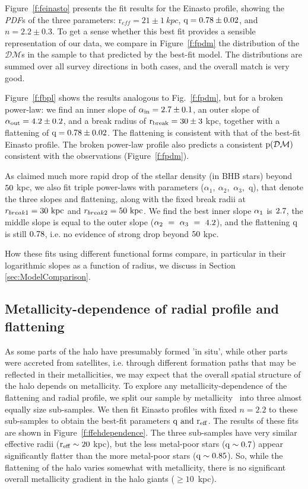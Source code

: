 \documentclass[12pt,preprint]{aastex}
\newcommand{\DM}{\mathcal{DM}}
\newcommand{\reff}{\ensuremath{\mathrm{r}_{eff}}}
\begin{document}
Figure~\ref{f:feinasto} presents the fit results for the Einasto profile,  showing the \textit{PDF}s of the three parameters: 
$\reff =21\pm1~kpc$, $\rm q=0.78\pm0.02$, and $n=2.2\pm0.3$.
To get a sense whether this best fit provides a sensible representation of our data, we compare
 in Figure~\ref{f:fpdm} the distribution of the $\DM$s in the sample to that predicted by the best-fit model. The distributions are summed over all survey directions in both cases, and the overall match is very good. 

Figure~\ref{f:fbpl} shows the results analogous to Fig.~\ref{f:fpdm}, but for a broken power-law: we find an inner slope of $\rm \alpha_{in}=2.7\pm0.1$, an outer slope of $\rm \alpha_{out}=4.2\pm0.2$, and a break radius of
 $\rm r_{break}=30\pm3~$kpc, together with a flattening of $\rm q=0.78\pm0.02$. The flattening is consistent with that of the best-fit Einasto profile. The broken power-law profile also predicts a consistent $\rm p(\DM)$ 
 consistent with the observations (Figure~\ref{f:fpdm}).
 
As \citet{Deason2014} claimed much more rapid drop of the stellar density (in BHB stars) beyond $\rm 50~$kpc, we also fit triple power-laws with parameters  ($\alpha_{1},~\alpha_{2}$,~$\alpha_{3}$,~q), that denote the three slopes and flattening, along with the fixed break radii at $r_{break1}=\rm 30~kpc$ and $r_{break2}=\rm 50~kpc$. We find the best inner slope $\rm \alpha_{1}$ is $\rm 2.7$, the middle slope is equal to the outer slope ($\rm \alpha_{2}~=~ \alpha_{3}~=~4.2$), and the flattening $\rm q$ is still $\rm 0.78$, i.e. no evidence of strong drop beyond $\rm 50~$kpc.

How these fits using different functional forms compare, in particular in their logarithmic slopes as a function of radius, we discuss in Section \ref{sec:ModelComparison}.

\subsection{Metallicity-dependence of radial profile and flattening}\label{sec:Results_Flattening}

As some parts of the halo have presumably formed 'in situ', while other parts were accreted from satellites, i.e. through different formation paths that may be reflected in their metallicities, 
 we may expect that the overall spatial structure of the halo depends on metallicity.
To explore any metallicity-dependence of the flattening and radial profile, we split our sample
by metallicity \ into three almost equally size sub-samples. We then fit Einasto profiles with fixed $n=2.2$ to these sub-samples to obtain the best-fit parameters $\rm q ~and ~r_{eff}$. The results of these fits are shown in Figure~\ref{f:ffehdependence}. The three sub-samples have very similar effective radii ($\rm r_{eff}\sim20~$kpc), but the less metal-poor stars ($\rm q\sim0.7$) appear
significantly flatter than the more metal-poor stars ($\rm q\sim0.85$).
So, while the flattening of the halo varies somewhat with metallicity, there is no significant overall metallicity gradient in the halo giants ($\ge 10$~kpc). 
\end{document}
